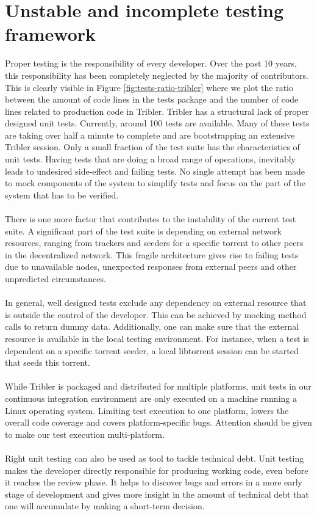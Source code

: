 \section{Unstable and incomplete testing framework}
Proper testing is the responsibility of every developer. Over the past 10 years, this responsibility has been completely neglected by the majority of contributors. This is clearly visible in Figure \ref{fig:tests-ratio-tribler} where we plot the ratio between the amount of code lines in the tests package and the number of code lines related to production code in Tribler. Tribler has a structural lack of proper designed unit tests. Currently, around 100 tests are available. Many of these tests are taking over half a minute to complete and are bootstrapping an extensive Tribler session. Only a small fraction of the test suite has the characteristics of unit tests. Having tests that are doing a broad range of operations, inevitably leads to undesired side-effect and failing tests. No single attempt has been made to mock components of the system to simplify tests and focus on the part of the system that has to be verified.\\\\
There is one more factor that contributes to the instability of the current test suite. A significant part of the test suite is depending on external network resources, ranging from trackers and seeders for a specific torrent to other peers in the decentralized network. This fragile architecture gives rise to failing tests due to unavailable nodes, unexpected responses from external peers and other unpredicted circumstances.\\\\
In general, well designed tests exclude any dependency on external resource that is outside the control of the developer. This can be achieved by mocking method calls to return dummy data. Additionally, one can make sure that the external resource is available in the local testing environment. For instance, when a test is dependent on a specific torrent seeder, a local libtorrent session can be started that seeds this torrent.\\\\
While Tribler is packaged and distributed for multiple platforms, unit tests in our continuous integration environment are only executed on a machine running a Linux operating system. Limiting test execution to one platform, lowers the overall code coverage and covers platform-specific bugs. Attention should be given to make our test execution multi-platform.\\\\
Right unit testing can also be used as tool to tackle technical debt. Unit testing makes the developer directly responsible for producing working code, even before it reaches the review phase. It helps to discover bugs and errors in a more early stage of development and gives more insight in the amount of technical debt that one will accumulate by making a short-term decision. %

